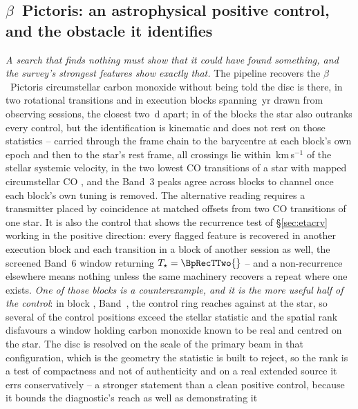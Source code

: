 \subsection{$\beta$~Pictoris: an astrophysical positive control, and the
obstacle it identifies} \label{sec:bpicval}

\emph{A search that finds nothing must show that it could have found something,
and the survey's strongest features show exactly that.} The pipeline recovers
the $\beta$~Pictoris circumstellar carbon monoxide without being told the disc
is there, in two rotational transitions and in \CsBpCoBlocks{} execution blocks
spanning \BpBaselineYr\,yr drawn from \CsBpCoSess{} observing sessions, the
closest two \CsBpCoSepMinD\,d apart; in \NStageOneBpicEb{} of the blocks the
star also outranks every control, but the identification is kinematic and does
not rest on those statistics -- carried through the frame chain to the
barycentre at each block's own epoch and then to the star's rest frame, all
\BpicPanelNCo{} crossings lie within \BpicDvCoHi\,km\,s$^{-1}$ of the stellar
systemic velocity, in the two lowest CO transitions of a star with mapped
circumstellar CO \citep{Dent2014,Matra2017}, and the Band~3 peaks agree across
blocks to \BpRecThreeTuneChanMax{} channel once each block's own tuning is
removed. The alternative reading requires a transmitter placed by coincidence
at matched offsets from two CO transitions of one star. It is also the control
that shows the recurrence test of \S\ref{sec:etacrv} working in the positive
direction: every flagged feature is recovered in another execution block and
each transition in a block of another session as well, the screened Band~6
window returning $T_\star=\BpRecTTwo{}$ -- and a non-recurrence elsewhere means
nothing unless the same machinery recovers a repeat where one exists.
\emph{One of those blocks is a counterexample, and it is the more useful half of
the control}: in block \texttt{\BpCtrlBlock}, Band~\BpCtrlBand, the control ring
reaches \BpCtrlRingMax{} against \BpCtrlStar{} at the star, so several of the
\NCtrl{} control positions exceed the stellar statistic and the spatial rank
disfavours a window holding carbon monoxide known to be real and centred on the
star. The disc is resolved on the scale of the primary beam in that
configuration, which is the geometry the statistic is built to reject, so the
rank is a test of compactness and not of authenticity and on a real extended
source it errs conservatively -- a stronger statement than a clean positive
control, because it bounds the diagnostic's reach as well as demonstrating it
